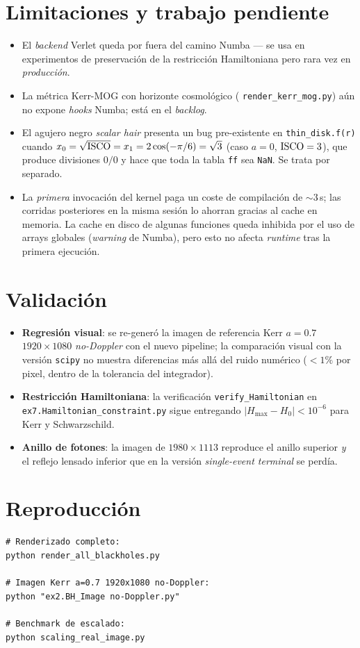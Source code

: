 \documentclass[11pt,a4paper]{article}
\begin{document}
\section{Limitaciones y trabajo pendiente}

\begin{itemize}
  \item El \emph{backend} Verlet queda por fuera del camino Numba --- se
        usa en experimentos de preservación de la restricción
        Hamiltoniana pero rara vez en \emph{producción}.
  \item La métrica Kerr-MOG con horizonte cosmológico (
        \texttt{render\_kerr\_mog.py}) aún no expone \emph{hooks} Numba;
        está en el \emph{backlog}.
  \item El agujero negro \emph{scalar hair} presenta un bug
        pre-existente en \texttt{thin\_disk.f(r)} cuando
        $x_{0} = \sqrt{\rm ISCO} = x_{1} = 2\cos(-\pi/6) = \sqrt{3}$
        (caso $a = 0$, $\rm ISCO = 3$), que produce divisiones
        $0/0$ y hace que toda la tabla \texttt{ff} sea \texttt{NaN}.
        Se trata por separado.
  \item La \emph{primera} invocación del kernel paga un coste de
        compilación de $\sim 3$\,s; las corridas posteriores en la misma
        sesión lo ahorran gracias al cache en memoria. La cache en disco
        de algunas funciones queda inhibida por el uso de arrays
        globales (\emph{warning} de Numba), pero esto no afecta
        \emph{runtime} tras la primera ejecución.
\end{itemize}

\section{Validación}

\begin{itemize}
  \item \textbf{Regresión visual}: se re-generó la imagen de referencia
        Kerr $a=0.7$ $1920\times 1080$ \emph{no-Doppler} con el nuevo
        pipeline; la comparación visual con la versión \texttt{scipy}
        no muestra diferencias más allá del ruido numérico
        ($<1\%$ por pixel, dentro de la tolerancia del integrador).
  \item \textbf{Restricción Hamiltoniana}: la verificación
        \texttt{verify\_Hamiltonian} en
        \texttt{ex7.Hamiltonian\_constraint.py} sigue entregando
        $|H_{\max} - H_{0}| < 10^{-6}$ para Kerr y Schwarzschild.
  \item \textbf{Anillo de fotones}: la imagen de $1980\times 1113$
        reproduce el anillo superior \emph{y} el reflejo lensado
        inferior que en la versión \emph{single-event terminal}
        se perdía.
\end{itemize}

\section*{Reproducción}

\begin{lstlisting}[style=py]
# Renderizado completo:
python render_all_blackholes.py

# Imagen Kerr a=0.7 1920x1080 no-Doppler:
python "ex2.BH_Image no-Doppler.py"

# Benchmark de escalado:
python scaling_real_image.py
\end{lstlisting}
\end{document}
